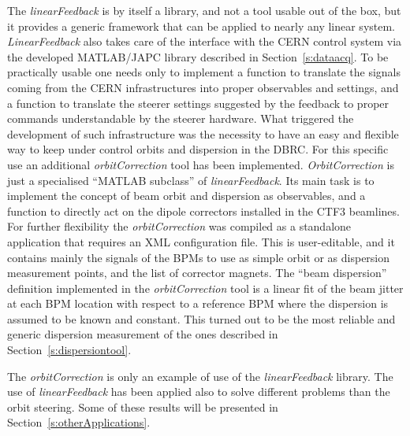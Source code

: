 The \emph{linearFeedback} is by itself a library, and not a tool usable out of the box,
but it provides a generic framework that can be applied to nearly any linear system.
\emph{LinearFeedback} also takes care of the interface with the CERN control system via the developed
MATLAB/JAPC library described in Section~\ref{s:dataacq}.
To be practically usable one needs only to implement a function to translate the signals coming from
the CERN infrastructures into proper observables and settings,
and a function to translate the steerer settings suggested by the feedback to proper commands
understandable by the steerer hardware.
What triggered the development of such infrastructure was the necessity to have an easy and flexible
way to keep under control orbits and dispersion in the DBRC.
For this specific use an additional \emph{orbitCorrection} tool has been implemented.
\emph{OrbitCorrection} is just a specialised ``MATLAB subclass'' of \emph{linearFeedback}. Its main
task is to implement the concept of beam orbit and dispersion as observables, 
and a function to directly act on the dipole correctors installed in the CTF3 beamlines.
For further flexibility the  \emph{orbitCorrection} was compiled as a standalone application that
requires an XML configuration file.
This is user-editable, and it contains mainly the signals of the BPMs to use as simple orbit or as
dispersion measurement points, and the list of corrector magnets.
The ``beam dispersion'' definition implemented in the \emph{orbitCorrection} tool is a linear fit of
the beam jitter at each BPM location with respect to a reference BPM where the dispersion is assumed
to be known and constant.
This turned out to be the most reliable and generic dispersion measurement of the ones described in
Section~\ref{s:dispersiontool}.

The \emph{orbitCorrection} is only an example of use of the \emph{linearFeedback} library.
The use of \emph{linearFeedback} has been applied also to solve different problems than the orbit
steering. Some of these results will be presented in Section~\ref{s:otherApplications}.










